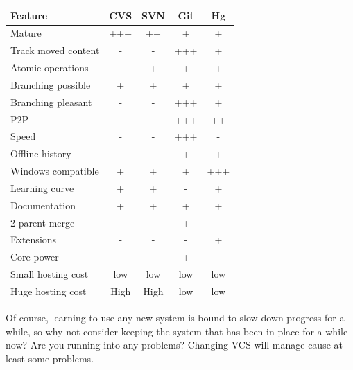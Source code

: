 \begin{tabular}{|l|c|c|c|c|}
\hline
Feature             & CVS & SVN & Git & Hg\\
\hline
Mature              & +++ & ++  &  +  & + \\
Track moved content &  -  &  -  & +++ & + \\ %
Atomic operations &  -  &  +  &  +  & + \\
Branching possible  &  +  &  +  &  +  & + \\
Branching pleasant  &  -  &  -  & +++ & + \\
P2P                 &  -  &  -  & +++ & ++\\ %
Speed               &  -  &  -  & +++ & - \\
Offline history     &  -  &  -  &  +  & + \\
Windows compatible  &  +  &  +  &  +  &+++\\
Learning curve      &  +  &  +  &  -  & + \\
Documentation       &  +  &  +  &  +  & + \\ %
2 parent merge      &  -  &  -  &  +  & - \\
Extensions          &  -  &  -  &  -  & + \\
Core power          &  -  &  -  &  +  & - \\
Small hosting cost  & low & low & low &low\\
Huge hosting cost   &High &High &low&low\\
\hline
\end{tabular}


Of course, learning to use any new system is bound to slow down progress for a while, so why not consider
keeping the system that has been in place for a while now? Are you running into any problems? Changing VCS
will manage cause at least some problems.

